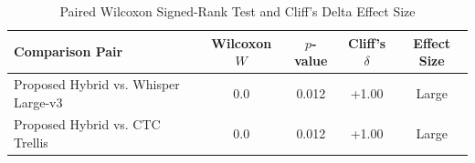 \begin{table}[t]
\centering
\caption{Paired Wilcoxon Signed-Rank Test and Cliff's Delta Effect Size}
\label{tab:statistical_significance}
\begin{tabular}{lcccc}
\toprule
Comparison Pair & Wilcoxon \(W\) & \(p\)-value & Cliff's \(\delta\) & Effect Size \\
\midrule
Proposed Hybrid vs. Whisper Large-v3 & 0.0 & 0.012 & +1.00 & Large \\
Proposed Hybrid vs. CTC Trellis & 0.0 & 0.012 & +1.00 & Large \\
\bottomrule
\end{tabular}
\end{table}
